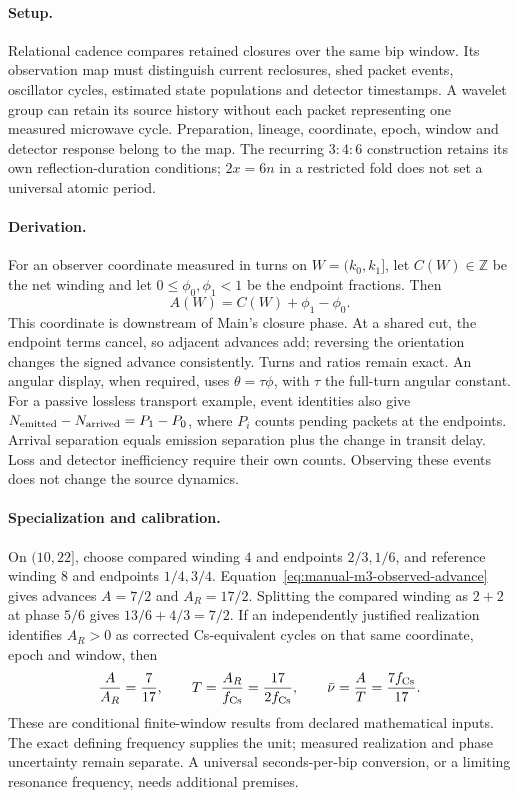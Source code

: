 \paragraph{Setup.}
Relational cadence compares retained closures over the same bip window.
Its observation map must distinguish current reclosures, shed packet events,
oscillator cycles, estimated state populations and detector timestamps.
A wavelet group can retain its source history without each packet representing
one measured microwave cycle. Preparation, lineage, coordinate, epoch,
window and detector response belong to the map.
The recurring \(3{:}4{:}6\) construction retains its own reflection-duration
conditions; \(2x=6n\) in a restricted fold does not set a universal atomic period.

\paragraph{Derivation.}
For an observer coordinate measured in turns on \(W=(k_0,k_1]\), let
\(C(W)\in\mathbb Z\) be the net winding and let
\(0\leq\phi_0,\phi_1<1\) be the endpoint fractions. Then
\begin{equation}
 A(W)=C(W)+\phi_1-\phi_0.
 \label{eq:manual-m3-observed-advance}
\end{equation}
This coordinate is downstream of Main's closure phase.
At a shared cut, the endpoint terms cancel, so adjacent advances add;
reversing the orientation changes the signed advance consistently.
Turns and ratios remain exact. An angular display, when required, uses
\(\theta=\tau\phi\), with \(\tau\) the full-turn angular constant.
For a passive lossless transport example, event identities also give
\(N_{\rm emitted}-N_{\rm arrived}=P_1-P_0\), where \(P_i\) counts pending
packets at the endpoints. Arrival separation equals emission separation plus
the change in transit delay. Loss and detector inefficiency require their own
counts. Observing these events does not change the source dynamics.

\paragraph{Specialization and calibration.}
On \((10,22]\), choose compared winding \(4\) and endpoints
\(2/3,1/6\), and reference winding \(8\) and endpoints \(1/4,3/4\).
Equation~\eqref{eq:manual-m3-observed-advance} gives advances
\(A=7/2\) and \(A_R=17/2\). Splitting the compared winding as \(2+2\)
at phase \(5/6\) gives \(13/6+4/3=7/2\).
If an independently justified realization identifies \(A_R>0\) as corrected
Cs-equivalent cycles on that same coordinate, epoch and window, then
\begin{equation}
 \frac{A}{A_R}=\frac7{17},\qquad
 T=\frac{A_R}{f_{\rm Cs}}=\frac{17}{2f_{\rm Cs}},\qquad
 \bar\nu=\frac{A}{T}=\frac{7f_{\rm Cs}}{17}.
 \label{eq:manual-m3-accumulated-si}
\end{equation}
These are conditional finite-window results from declared mathematical inputs.
The exact defining frequency supplies the unit; measured realization and
phase uncertainty remain separate. A universal seconds-per-bip conversion,
or a limiting resonance frequency, needs additional premises.

